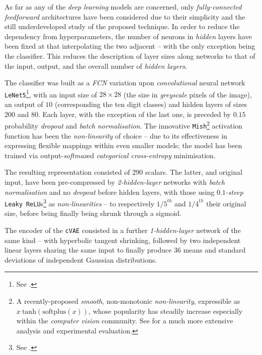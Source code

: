 As far as any of the \textit{deep learning} models are concerned, only \textit{fully-connected feedforward} architectures have been considered due to their simplicity and the still underdeveloped study of the proposed technique. In order to reduce the dependency from hyperparameters, the number of neurons in \textit{hidden} layers have been fixed at that interpolating the two adjacent -- with the only exception being the classifier. This reduces the description of layer sizes along networks to that of the input, output, and the overall number of \textit{hidden layers}.

The classifier was built as a \textit{FCN} variation upon \textit{convolutional} neural network \texttt{LeNet5}\footnote{See \cite{LeCunEtAl1998LeNet5}.}, with an input size of $28 \times 28$ (the size in \textit{greyscale} pixels of the image), an output of $10$ (corresponding the ten digit classes) and hidden layers of sizes $200$ and $80$. Each layer, with the exception of the last one, is preceded by $0.15$ probability \textit{dropout} and \textit{batch normalisation}. The innovative \texttt{Mish}\footnote{A recently-proposed \textit{smooth}, non-monotonic \textit{non-linearity}, expressible as $x\ \text{tanh}(\text{softplus}(x))$, whose popularity has steadily increase especially within the \textit{computer vision} community. See \cite{Misra2019Mish} for a much more extensive analysis and experimental evaluation.} activation function has been the \textit{non-linearity} of choice -- due to its effectiveness in expressing flexible mappings within even smaller models; the model has been trained via output-\textit{softmax}ed \textit{categorical cross-entropy} minimisation.

The resulting representation consisted of $290$ scalars. The latter, and original input, have been pre-compressed by \textit{2-hidden-layer} networks with \textit{batch normalisation} and no \textit{dropout} before hidden layers, with those using \textit{$0.1$-steep} \texttt{Leaky ReLU}s\footnote{See \cite{Xu2015EmpiricalEO}.} as \textit{non-linearities} -- to respectively ${1/5}^{th}$ and ${1/4}^{th}$ their original size, before being finally being shrunk through a sigmoid.

The encoder of the \texttt{cVAE} consisted in a further \textit{1-hidden-layer} network of the same kind -- with hyperbolic tangent shrinking, followed by two independent linear layers sharing the same input to finally produce $36$ means and standard deviations of independent Gaussian distributions.

